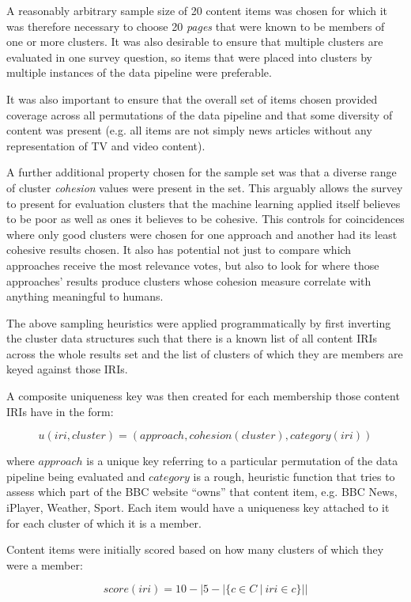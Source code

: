 A reasonably arbitrary sample size of 20 content items was chosen
for which it was therefore necessary to choose 20 \emph{pages} that
were known to be members of one or more clusters. It was also
desirable to ensure that multiple clusters are evaluated in one
survey question, so items that were placed into clusters by multiple
instances of the data pipeline were preferable.

It was also important to ensure that the overall set of items
chosen provided coverage across all permutations of the data pipeline
and that some diversity of content was present (e.g. all items are
not simply news articles without any representation of TV and video
content).

A further additional property chosen for the sample set was that
a diverse range of cluster \emph{cohesion} values were present in the
set. This arguably allows the survey to present for evaluation
clusters that the machine learning applied itself believes to be poor
as well as ones it believes to be cohesive. This controls
for coincidences where only good clusters were chosen for one approach
and another had its least cohesive results chosen. It also has
potential not just to compare which approaches receive the most
relevance votes, but also to look for where those approaches' results
produce clusters whose cohesion measure correlate with anything
meaningful to humans.

The above sampling heuristics were applied programmatically by first
inverting the cluster data structures such that there is a known
list of all content IRIs across the whole results set and the list
of clusters of which they are members are keyed against those IRIs.

A composite uniqueness key was then created for each membership those
content IRIs have in the form:

$$
u(iri, cluster) = (approach, cohesion(cluster), category(iri))
$$

\noindent where $approach$ is a unique key referring to a particular
permutation of the data pipeline being evaluated and $category$ is
a rough, heuristic function that tries to assess which part of the BBC
website ``owns'' that content item, e.g. BBC News, iPlayer, Weather,
Sport. Each item would have a uniqueness key attached to it for each
cluster of which it is a member.

Content items were initially scored based on how many clusters of
which they were a member:

$$
score(iri) = 10 - |5 - \left\vert{\{c \in C \: | \: iri \in c\}}\right\vert|
$$

